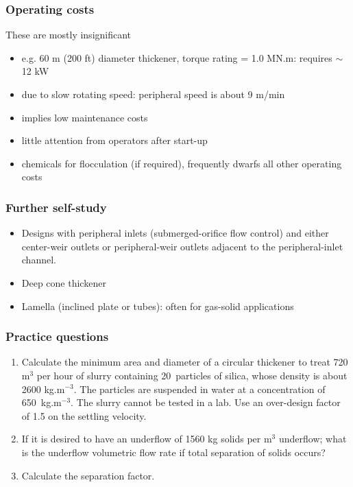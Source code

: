 \begin{frame}\frametitle{Operating costs}
	These are mostly insignificant
	\begin{itemize}
		\item	e.g. 60 m (200 ft) diameter thickener, torque rating = 1.0 MN.m: requires $\sim$ 12 kW
		\item	due to slow rotating speed: peripheral speed is about 9 m/min 
		\item	implies low maintenance costs
		\item	little attention from operators after start-up
		\item	chemicals for flocculation (if required), frequently dwarfs all other operating costs 
	\end{itemize}
\end{frame}

\begin{frame}\frametitle{Further self-study}
	\begin{itemize}
		\item	Designs with peripheral inlets (submerged-orifice flow control) and either center-weir outlets or peripheral-weir outlets adjacent to the peripheral-inlet channel.
		\item	Deep cone thickener
		\item	Lamella (inclined plate or tubes): often for gas-solid applications 
	\end{itemize}
\end{frame}

\begin{frame}\frametitle{Practice questions}
	\begin{enumerate}
		\item	Calculate the minimum area and diameter of a circular thickener to treat 720 $\text{m}^3$ per hour of slurry containing 20\micron~particles of silica, whose density is about 2600 kg.$\text{m}^{-3}$. The particles are suspended in water at a concentration of 650~kg.$\text{m}^{-3}$. The slurry cannot be tested in a lab. Use an over-design factor of 1.5 on the settling velocity.
		\item	If it is desired to have an underflow of 1560 kg solids per $\text{m}^{3}$ underflow; what is the underflow volumetric flow rate if total separation of solids occurs?
		\item	Calculate the separation factor.		
	\end{enumerate}	
\end{frame}

